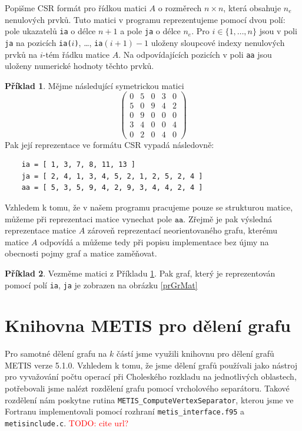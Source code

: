 \documentclass[11pt,american,czech,oneside]{book}
\theoremstyle{plain}
\theoremstyle{definition}
\newtheorem{example}{Příklad}
\newcommand{\TODO}[1]{\textcolor{red}{TODO: #1}}
\begin{document}
Popišme CSR formát pro řídkou matici $A$ o rozměrech $n \times n$, která obsahuje $n_e$ nenulových prvků. Tuto matici v programu reprezentujeme pomocí dvou polí: pole ukazatelů \texttt{ia} o délce $n+1$ a pole \texttt{ja} o délce $n_e$. Pro $i\in\{1,\ldots,n\}$ jsou v poli \texttt{ja} na pozicích \texttt{ia($i$)}, \ldots, \texttt{ia$(i+1)-1$} uloženy sloupcové indexy nenulových prvků na $i$-tém řádku matice $A$. Na odpovídajících pozicích v poli \texttt{aa} jsou uloženy numerické hodnoty těchto prvků.

\begin{example}
  \label{CSRexample}
  Mějme následující symetrickou matici
  \[
    \begin{pmatrix}
      0 & 5 & 0 & 3 & 0 \\
      5 & 0 & 9 & 4 & 2 \\
      0 & 9 & 0 & 0 & 0 \\
      3 & 4 & 0 & 0 & 4 \\
      0 & 2 & 0 & 4 & 0
    \end{pmatrix}
  \]
  Pak její reprezentace ve formátu CSR vypadá následovně:
  \begin{verbatim}
    ia = [ 1, 3, 7, 8, 11, 13 ]
    ja = [ 2, 4, 1, 3, 4, 5, 2, 1, 2, 5, 2, 4 ]
    aa = [ 5, 3, 5, 9, 4, 2, 9, 3, 4, 4, 2, 4 ]
  \end{verbatim}
\end{example}

Vzhledem k tomu, že v našem programu pracujeme pouze se strukturou matice, můžeme při reprezentaci matice vynechat pole $\texttt{aa}$. Zřejmě je pak výsledná reprezentace matice $A$ zároveň reprezentací neorientovaného grafu, kterému matice $A$ odpovídá a můžeme tedy při popisu implementace bez újmy na obecnosti pojmy graf a matice zaměňovat.

\begin{example}
  Vezměme matici z Příkladu \ref{CSRexample}. Pak graf, který je reprezentován pomocí polí \texttt{ia}, \texttt{ja} je zobrazen na obrázku \ref{prGrMat}
\end{example}

\section{Knihovna METIS pro dělení grafu}

Pro samotné dělení grafu na $k$ částí jsme využili knihovnu pro dělení grafů METIS \cite{kary:13} verze 5.1.0. Vzhledem k tomu, že jsme dělení grafů používali jako nástroj pro vyvažování počtu operací při Choleského rozkladu na jednotlivých oblastech, potřebovali jsme nalézt rozdělení grafu pomocí vrcholového separátoru. Takové rozdělení nám poskytne rutina \texttt{METIS\_ComputeVertexSeparator}, kterou jsme ve Fortranu implementovali pomocí rozhraní \texttt{metis\_interface.f95} a \texttt{metisinclude.c}. \TODO{cite url?}
\end{document}
